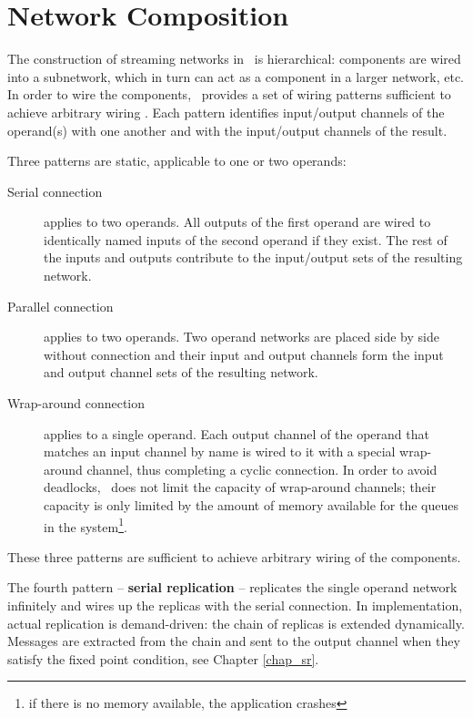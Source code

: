 

\section{Network Composition}
The construction of streaming networks in \ak\ is hierarchical: components are wired into a subnetwork, which in turn can act as a component in a larger network, etc. In order to wire the components, \ak\ provides a set of wiring patterns sufficient to achieve arbitrary wiring \cite{astrakahn}. Each pattern identifies input/output channels of the operand(s) with one another and with the input/output channels of the result.

Three patterns are static, applicable to one or two operands:
\begin{description}
\item[Serial connection] applies to two operands. All outputs of the first operand are wired to identically named inputs of the second operand if they exist. The rest of the inputs and outputs contribute to the input/output sets of the resulting network.

\item[Parallel connection] applies to two operands. Two operand networks are placed side by side without connection and their input and output channels form the input and output channel sets of the resulting network.

\item[Wrap-around connection] applies to a single operand. Each output channel of the operand that matches an input channel by name is wired to it with a special wrap-around channel, thus completing a cyclic connection. In order to avoid deadlocks, \ak\ does not limit the capacity of wrap-around channels; their capacity is only limited by the amount of memory available for the queues in the system\footnote{if there is no memory available, the application crashes}.
\end{description}
These three patterns are sufficient to achieve arbitrary wiring of the components. %

The fourth pattern -- \textbf{serial replication} -- replicates the single operand network infinitely and wires up the replicas with the serial connection. In implementation, actual replication is demand-driven: the chain of replicas is extended dynamically. Messages are extracted from the chain and sent to the output channel when they satisfy the fixed point condition, see Chapter \ref{chap_sr}.

